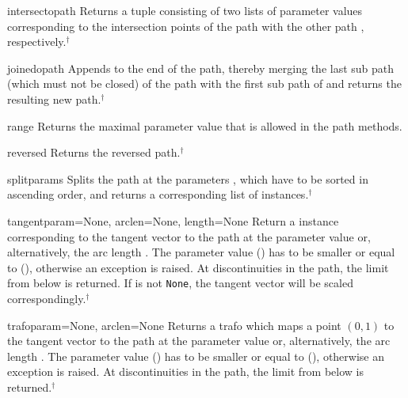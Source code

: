 \begin{methoddesc}{intersect}{opath}
  Returns a tuple consisting of two lists of parameter values
  corresponding to the intersection points of the path with the other
  path , respectively.$^\dagger$
\end{methoddesc}

\begin{methoddesc}{joined}{opath}
  Appends  to the end of the path, thereby merging the last
  sub path (which must not be closed) of the path with the first sub
  path of  and returns the resulting new path.$^\dagger$
\end{methoddesc}

\begin{methoddesc}{range}{}
  Returns the maximal parameter value  that is allowed in the
  path methods.
\end{methoddesc}

\begin{methoddesc}{reversed}{}
  Returns the reversed path.$^\dagger$
\end{methoddesc}

\begin{methoddesc}{split}{params}
  Splits the path at the parameters , which have to be
  sorted in ascending order, and returns a corresponding list of
   instances.$^\dagger$
\end{methoddesc}

\begin{methoddesc}{tangent}{param=None, arclen=None, length=None}
  Return a  instance corresponding to the tangent vector
  to the path at the parameter value  or, alternatively, the arc length
  . The parameter value  () has to be smaller
  or equal to  (),
  otherwise an exception is raised.  At discontinuities in the path,
  the limit from below is returned. If  is not
  \texttt{None}, the tangent vector will be scaled correspondingly.$^\dagger$
\end{methoddesc}


\begin{methoddesc}{trafo}{param=None, arclen=None}
  Returns a trafo which maps a point $(0, 1)$ to the tangent vector to
  the path at the parameter value  or, alternatively, the
  arc length .  The parameter value  () has to
  be smaller or equal to 
  (), otherwise an exception is raised.  At
  discontinuities in the path, the limit from below is returned.$^\dagger$
\end{methoddesc}

